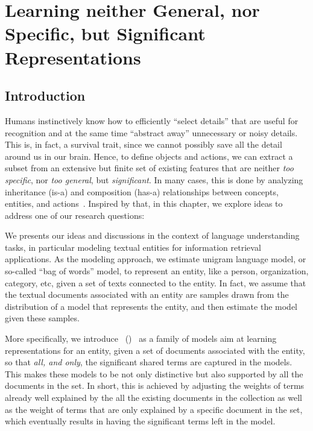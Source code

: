 \chapter{Learning neither General, nor Specific, but Significant Representations}
\label{chap:2}

\section{Introduction}
Humans instinctively know how to efficiently ``select details'' that are useful for recognition and at the same time ``abstract away'' unnecessary or noisy details.~\cite{tenenbaum2011grow, gentner1997structure, battaglia2018relational} 
This is, in fact, a survival trait, since we cannot possibly save all the detail around us in our brain. Hence, to define objects and actions, we can extract a subset from an extensive but finite set of existing features that are neither \emph{too specific}, nor \emph{too general}, but \emph{significant}. In many cases, this is done by analyzing inheritance (is-a) and composition (has-a) relationships between concepts, entities, and actions~\citep{goodwin2005reasoning, botvinick2008hierarchical}. 
Inspired by that, in this chapter, we explore ideas to address one of our research questions:


We presents our ideas and discussions in the context of language understanding tasks, in particular modeling textual entities for information retrieval applications. As the modeling approach, we estimate unigram language model, or so-called  ``bag of words'' model, to represent an entity, like a person, organization, category, etc, given a set of texts connected to the entity.  In fact, we assume that the textual documents associated with an entity are samples drawn from the distribution of a model that represents the entity, and then estimate the model given these samples.

More specifically, we introduce \textsl{\swlms}\ (\acswlm)~\cite{Dehghani:CIKM2016:long, Dehghani:2016:CHIIR, Dehghani2016:trec} as a family of models aim at learning representations for an entity, given a set of documents associated with the entity, so that \emph{all, and only}, the significant shared terms are captured in the models. This makes these models to be not only distinctive but also supported by all the documents in the set. In short, this is achieved by adjusting the weights of terms already well explained by the all the existing documents in the collection as well as the weight of terms that are only explained by a specific document in the set, which eventually results in having the significant terms left in the model. 



